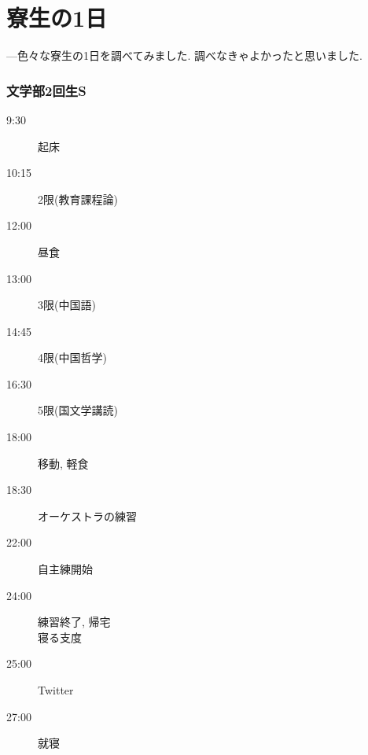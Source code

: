 \documentclass[10pt,b5jsbook,dvips,dvipdfmx,openany]{jsbook}
\theoremstyle{definition}
\begin{document}
	\section{寮生の1日}
	---色々な寮生の1日を調べてみました. 調べなきゃよかったと思いました.
	\begin{multicols}{3}








			\subsubsection{文学部2回生S}

			\begin{description}
			\item[ 9:30] 起床
			\item[10:15] 2限(教育課程論)
			\item[12:00] 昼食
			\item[13:00] 3限(中国語)
			\item[14:45] 4限(中国哲学)
			\item[16:30] 5限(国文学講読)
			\item[18:00] 移動, 軽食
			\item[18:30] オーケストラの練習
			\item[22:00] 自主練開始
			\item[24:00] 練習終了, 帰宅 \\ 寝る支度
			\item[25:00] Twitter
			\item[27:00] 就寝


\end{description}
\end{multicols}
\end{document}
